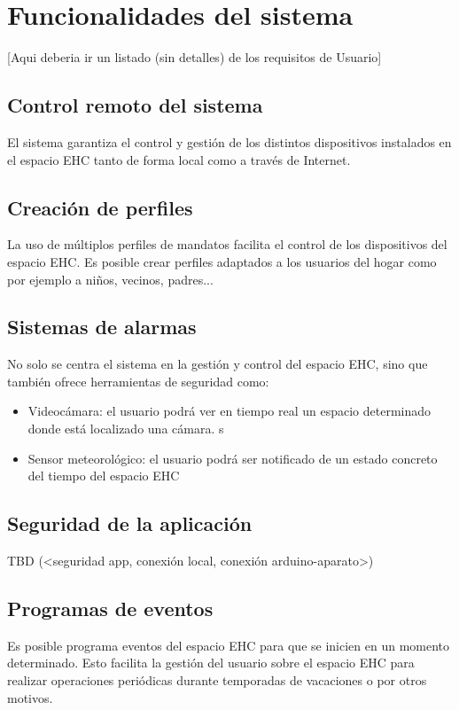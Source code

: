 \chapter{Funcionalidades del sistema }

[Aqui deberia ir un listado (sin detalles) de los requisitos de Usuario]

\section{Control remoto del sistema}
    El sistema garantiza el control y gestión de los distintos dispositivos instalados en el espacio EHC tanto de forma local como a través de Internet.

\section{Creación de perfiles}
    La uso de múltiplos perfiles de mandatos facilita el control de los dispositivos del espacio EHC. Es posible crear perfiles adaptados a los usuarios del hogar como por ejemplo  a niños, vecinos, padres...

\section{Sistemas de alarmas}
    No solo se centra el sistema en la gestión y control del espacio EHC, sino que también ofrece herramientas de seguridad como:
    \begin{itemize}
        \item Videocámara: el usuario podrá ver en tiempo real un espacio determinado donde está localizado una cámara. s
        \item Sensor meteorológico: el usuario podrá ser notificado de un estado concreto del tiempo del espacio EHC
    \end{itemize}

\section{Seguridad de la aplicación}
    TBD (<seguridad app, conexión local, conexión arduino-aparato>)

\section{Programas de eventos}
    Es posible programa eventos del espacio EHC para que se inicien en un momento determinado. Esto facilita la gestión del usuario sobre el espacio EHC para realizar operaciones periódicas durante temporadas de vacaciones o por otros motivos.

